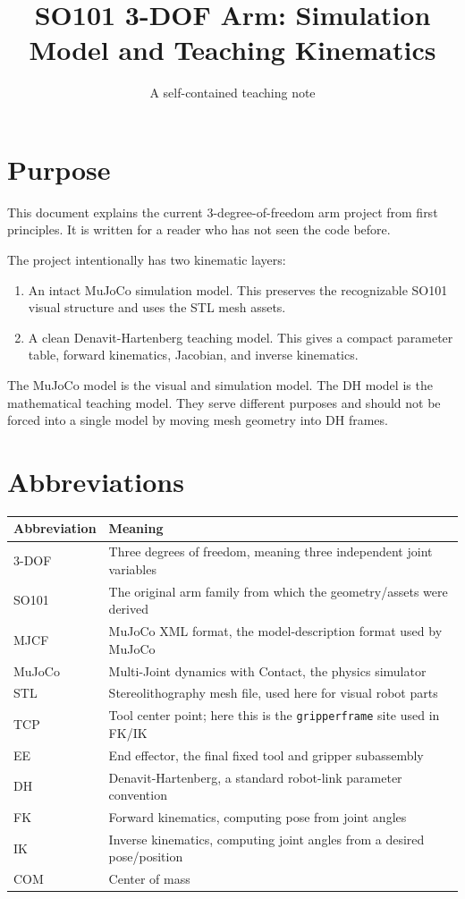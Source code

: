 \documentclass[11pt]{article}
\title{SO101 3-DOF Arm: Simulation Model and Teaching Kinematics}
\author{A self-contained teaching note}
\date{}
\begin{document}
\maketitle

\section{Purpose}
This document explains the current 3-degree-of-freedom arm project from first
principles. It is written for a reader who has not seen the code before.

The project intentionally has two kinematic layers:
\begin{enumerate}[leftmargin=1.3em]
  \item An intact MuJoCo simulation model. This preserves the recognizable
        SO101 visual structure and uses the STL mesh assets.
  \item A clean Denavit-Hartenberg teaching model. This gives a compact
        parameter table, forward kinematics, Jacobian, and inverse kinematics.
\end{enumerate}

The MuJoCo model is the visual and simulation model. The DH model is the
mathematical teaching model. They serve different purposes and should not be
forced into a single model by moving mesh geometry into DH frames.

\section{Abbreviations}
\begin{center}
\begin{tabular}{@{}ll@{}}
\toprule
Abbreviation & Meaning \\
\midrule
3-DOF & Three degrees of freedom, meaning three independent joint variables \\
SO101 & The original arm family from which the geometry/assets were derived \\
MJCF & MuJoCo XML format, the model-description format used by MuJoCo \\
MuJoCo & Multi-Joint dynamics with Contact, the physics simulator \\
STL & Stereolithography mesh file, used here for visual robot parts \\
TCP & Tool center point; here this is the \texttt{gripperframe} site used in FK/IK \\
EE & End effector, the final fixed tool and gripper subassembly \\
DH & Denavit-Hartenberg, a standard robot-link parameter convention \\
FK & Forward kinematics, computing pose from joint angles \\
IK & Inverse kinematics, computing joint angles from a desired pose/position \\
COM & Center of mass \\
\bottomrule
\end{tabular}
\end{center}
\end{document}
